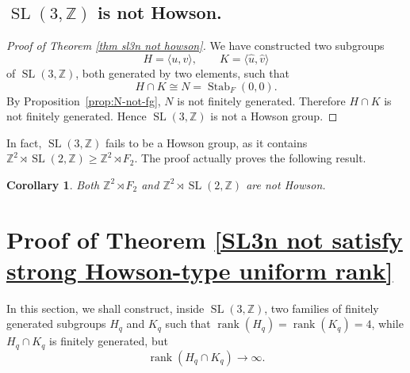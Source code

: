 \documentclass[]{amsart}
\newtheorem*{fixed point criterion}{\fixed point criterion}
\newtheorem{cor}[thm]{Corollary}
\theoremstyle{definition}
\theoremstyle{remark}
\numberwithin{equation}{section}
\newcommand{\SL}{\operatorname{SL}}
\newcommand{\Z}{\mathbb Z}
\newcommand{\rank}{\operatorname{rank}}
\newcommand{\Stab}{\operatorname{Stab}}
\begin{document}
\subsection{$\SL(3,\Z)$ is not Howson.}
\begin{proof}[Proof of Theorem \ref{thm sl3n not howson}]
We have constructed two subgroups
\[
    H=\langle u,v\rangle,
    \qquad
    K=\langle \hat u,\hat v\rangle
\]
of $\SL(3,\Z)$, both generated by two elements, such that
\[
    H\cap K\cong N=\Stab_F(0,0).
\]
By Proposition~\ref{prop:N-not-fg}, $N$ is not finitely generated.  Therefore
$H\cap K$ is not finitely generated. Hence $\SL(3,\Z)$ is not a Howson group.
\end{proof}


In fact, $\SL(3,\Z)$ fails to be a Howson group, as it contains
$\Z^2\rtimes \SL(2,\Z)\geq \Z^2\rtimes F_2$. The proof actually proves the following result.

\begin{cor}
    Both $\Z^2\rtimes F_2$ and $\Z^2\rtimes \SL(2,\Z)$ are not Howson.
\end{cor}


\section{Proof of Theorem \ref{SL3n not satisfy strong Howson-type uniform rank}}

In this section, we shall construct, inside $\SL(3,\Z)$, two families of finitely generated subgroups
$H_q$ and $K_q$ such that $\rank(H_q)=\rank(K_q)=4$,
while $H_q\cap K_q$ is finitely generated, but
\[
\rank(H_q\cap K_q)\to \infty.
\]

\end{document}
